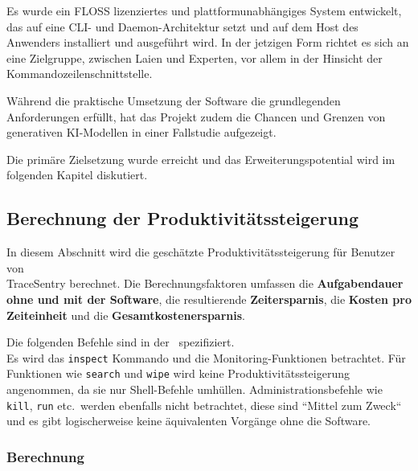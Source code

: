 \documentclass[a4paper,12pt]{report}
\begin{document}
    Es wurde ein FLOSS lizenziertes und plattformunabhängiges System entwickelt, das auf eine CLI- und Daemon-Architektur setzt und auf dem Host des Anwenders installiert und ausgeführt wird.
    In der jetzigen Form richtet es sich an eine Zielgruppe, zwischen Laien und Experten, vor allem in der Hinsicht der Kommandozeilenschnittstelle.

    Während die praktische Umsetzung der Software die grundlegenden Anforderungen erfüllt, hat das Projekt zudem die Chancen und Grenzen von generativen KI-Modellen in einer Fallstudie aufgezeigt.

    Die primäre Zielsetzung wurde erreicht und das Erweiterungspotential wird im folgenden Kapitel diskutiert.

    \subsection{Berechnung der Produktivitätssteigerung}\label{subsec:berechnung-der-produktivitatssteigerung}
    In diesem Abschnitt wird die geschätzte Produktivitätssteigerung für Benutzer von \\TraceSentry berechnet.
    Die Berechnungsfaktoren umfassen die \textbf{Aufgabendauer ohne und mit der Software}, die resultierende  \textbf{Zeitersparnis}, die  \textbf{Kosten pro Zeiteinheit} und die  \textbf{Gesamtkostenersparnis}.

    Die folgenden Befehle sind in der~ spezifiziert.
    \\Es wird das \texttt{inspect} Kommando und die Monitoring-Funktionen betrachtet.
    Für Funktionen wie \texttt{search} und \texttt{wipe} wird keine Produktivitätssteigerung angenommen, da sie nur Shell-Befehle umhüllen.
    Administrationsbefehle wie \texttt{kill}, \texttt{run} etc.\ werden ebenfalls nicht betrachtet, diese sind ``Mittel zum Zweck`` und es gibt logischerweise keine äquivalenten Vorgänge ohne die Software.

    \clearpage

    \subsubsection{Berechnung}
\end{document}
